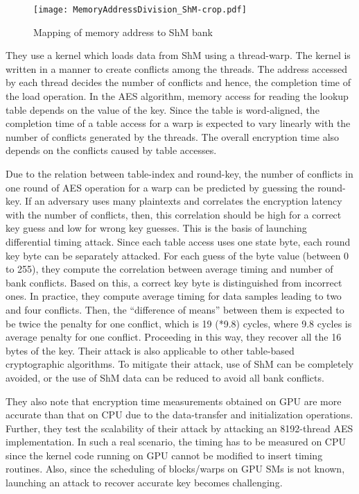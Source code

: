  
\begin{figure} [htbp]
\centering
\texttt{[image: MemoryAddressDivision\_ShM-crop.pdf]}
\caption{Mapping of memory address to ShM bank \cite{jiang2017novel}  }\label{fig:MemoryAddressDivision_ShM}
\end{figure}

They use a kernel which loads data from ShM using a thread-warp. The kernel is written in a manner to create conflicts among the threads. The address accessed by each thread decides the number of conflicts and hence, the completion time of the load operation. In the AES algorithm, memory access for reading the lookup table depends on the value of the key. Since the table is word-aligned, the completion time of a table access for a warp is expected to vary linearly with the number of conflicts generated by the threads. The overall encryption time also depends on the conflicts caused by table accesses. 
  
Due to the relation between table-index and round-key, the number of conflicts in one round of AES operation for a warp can be predicted by guessing the round-key. If an adversary uses many plaintexts and correlates the encryption latency with the number of conflicts, then, this correlation should be high for a correct key guess and low for wrong key guesses.  This is the basis of launching differential timing attack. Since each table access uses one state byte, each round key byte can be separately attacked. For each guess of the byte value (between 0 to 255), they compute the correlation between average timing and number of bank conflicts. Based on this, a correct key byte is distinguished from incorrect ones. In practice, they compute average timing for data samples leading to two and four conflicts. Then, the ``difference of means'' between them is expected to be twice the penalty for one conflict, which is 19 (*9.8) cycles, where 9.8 cycles is average penalty for one conflict. Proceeding in this way, they recover all the 16 bytes of the key.  Their attack is also applicable to other table-based cryptographic algorithms. To mitigate their attack, use of ShM can be completely avoided, or the use of ShM data can be reduced to avoid all bank conflicts. 
 
They also note that encryption time measurements obtained on GPU are more accurate than that on CPU due to the data-transfer and initialization operations. Further, they test the scalability of their attack by attacking an 8192-thread AES implementation. In such a real scenario, the timing has to be measured on CPU since the kernel code running on GPU cannot be modified to insert timing routines. Also, since the scheduling of blocks/warps on GPU SMs is not known, launching an attack to recover accurate key becomes challenging.  
 
